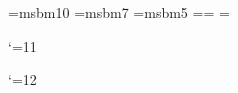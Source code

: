 \baselineskip=14pt

\hsize=118mm
\hoffset=7mm
\vsize=185mm
\voffset=10mm

\def\Jc{{\cal J}}
\def\Sc{{\cal S}}
\def\Xc{{\cal X}}

\def\es{\emptyset}
\def\fl{\forall}
\def\ify{\infty}
\def\lgl{\langle}
\def\ot{\otimes}
\def\ov{\overline}
\def\part{\partial}
\def\ra{\rightarrow}
\def\rgl{\rangle}
\def\sbs{\subset}
\def\sps{\supset}
\def\ts{\times}
\def\wh{\widehat}
\def\wt{\widetilde}
\def\wdg{\wedge}

\def\Arg{\mathop{\rm Arg}\nolimits}
\def\covol{\mathop{\rm covol}\nolimits}
\def\Covol{\mathop{\rm Covol}\nolimits}
\def\Im{\mathop{\rm Im}\nolimits}
\def\Ker{\mathop{\rm Ker}\nolimits}
\def\mod{\mathop{\rm mod}\nolimits}
\def\Supp{\mathop{\rm Supp}\nolimits}
\def\Re{\mathop{\rm Re}\nolimits}


\def\hra{\hookrightarrow}
\def\longra{\longrightarrow}
\def\Ra{\Rightarrow}
\def\Lra{\Leftrightarrow}

\def\xx{\vrule height 0.3em depth 0.2em width 0.3em}

\def\build#1_#2^#3{\mathrel{
\mathop{\kern 0pt#1}\limits_{#2}^{#3}}}


\def\a{\alpha}
\def\b{\beta}
\def\d{\delta}
\def\D{\Delta}
\def\g{\gamma}
\def\G{\Gamma}
\def\lb{\lambda}
\def\L{\Lambda}
\def\Om{\Omega}
\def\s{\sigma}
\def\Si{\Sigma}
\def\t{\theta}
\def\ve{\varepsilon}
\def\vp{\varphi}
\def\z{\zeta}

\font\tenbb=msbm10
\font\sevenbb=msbm7
\font\fivebb=msbm5
\newfam\bbfam
\textfont\bbfam=\tenbb \scriptfont\bbfam=\sevenbb
\scriptscriptfont\bbfam=\fivebb
\def\bb{\fam\bbfam}

\def\Rb{{\bb R}}
\def\Qb{{\bb Q}}
\def\Cb{{\bb C}}
\def\Fb{{\bb F}}
\def\Zb{{\bb Z}}
\def\Tb{{\bb T}}
\def\Nb{{\bb N}}

\def\Ec{{\cal E}}
\def\Hc{{\cal H}}
\def\Ic{{\cal I}}
\def\Sc{{\cal S}}
\def\Xc{{\cal X}}
\def\Uc{{\cal U}}


\def\build#1_#2^#3{\mathrel{
\mathop{\kern 0pt#1}\limits_{#2}^{#3}}}

\catcode`\@=11
\def\displaylinesno #1{\displ@y\halign{
\hbox to\displaywidth{$\@lign\hfil\displaystyle##\hfil$}&
\llap{$##$}\crcr#1\crcr}}

\def\ldisplaylinesno #1{\displ@y\halign{
\hbox to\displaywidth{$\@lign\hfil\displaystyle##\hfil$}&
\kern-\displaywidth\rlap{$##$}
\tabskip\displaywidth\crcr#1\crcr}}
\catcode`\@=12


